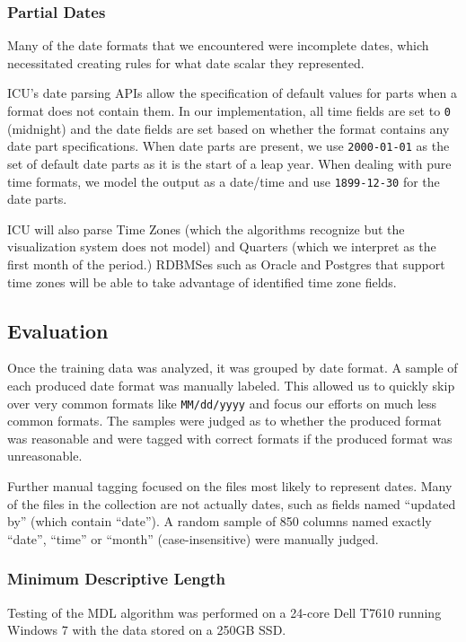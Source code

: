 \subsubsection{Partial Dates}
Many of the date formats that we encountered were incomplete dates, which necessitated creating rules for what date scalar they represented.

ICU's date parsing APIs allow the specification of default values for parts when a format does not contain them. In our implementation, all time fields are set to \texttt{0} (midnight) and the date fields are set based on whether the format contains any date part specifications. When date parts are present, we use \texttt{2000-01-01} as the set of default date parts as it is the start of a leap year. When dealing with pure time formats, we model the output as a date/time and use \texttt{1899-12-30} for the date parts.

ICU will also parse Time Zones (which the algorithms recognize but the visualization system does not model) and Quarters (which we interpret as the first month of the period.) RDBMSes such as Oracle and Postgres that support time zones will be able to take advantage of  identified time zone fields.

\subsection{Evaluation}
Once the training data was analyzed, it was grouped by date format. A sample of each produced date format was manually labeled. This allowed us to quickly skip over very common formats like \texttt{MM/dd/yyyy} and focus our efforts on much less common formats. The samples were judged as to whether the produced format was reasonable and were tagged with correct formats if the produced format was unreasonable.

Further manual tagging focused on the files most likely to represent dates. Many of the files in the collection are not actually dates, such as fields named ``updated by'' (which contain ``date''). A random sample of 850 columns named exactly ``date'', ``time'' or ``month'' (case-insensitive) were manually judged.\\

\subsubsection{Minimum Descriptive Length}
Testing of the MDL algorithm was performed on a 24-core Dell T7610 running Windows 7 with the data stored on a 250GB SSD.

